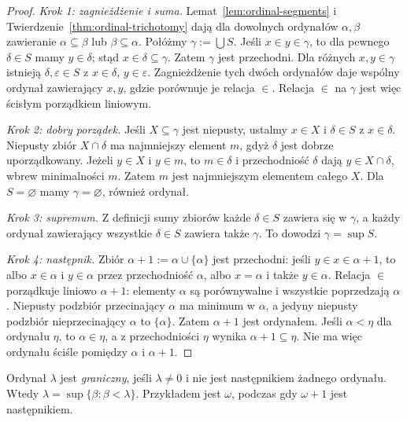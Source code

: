 \begin{proof}
\emph{Krok 1: zagnieżdżenie i suma.}
Lemat~\ref{lem:ordinal-segments}
i Twierdzenie~\ref{thm:ordinal-trichotomy}
dają dla dowolnych ordynałów
$\alpha,\beta$ zawieranie
$\alpha\subseteq\beta$ lub
$\beta\subseteq\alpha$.
Połóżmy $\gamma:=\bigcup S$.
Jeśli $x\in y\in\gamma$, to
dla pewnego $\delta\in S$
mamy $y\in\delta$; stąd
$x\in\delta\subseteq\gamma$.
Zatem $\gamma$ jest przechodni.
Dla różnych $x,y\in\gamma$
istnieją $\delta,\varepsilon\in S$
z $x\in\delta$, $y\in\varepsilon$.
Zagnieżdżenie tych dwóch ordynałów
daje wspólny ordynał zawierający
$x,y$, gdzie porównuje je relacja $\in$.
Relacja $\in$ na $\gamma$
jest więc ścisłym porządkiem liniowym.

\emph{Krok 2: dobry porządek.}
Jeśli $X\subseteq\gamma$ jest niepusty,
ustalmy $x\in X$ i $\delta\in S$
z $x\in\delta$. Niepusty zbiór
$X\cap\delta$ ma najmniejszy
element $m$, gdyż $\delta$ jest
dobrze uporządkowany.
Jeżeli $y\in X$ i $y\in m$,
to $m\in\delta$ i przechodniość
$\delta$ dają $y\in X\cap\delta$,
wbrew minimalności $m$.
Zatem $m$ jest najmniejszym
elementem całego $X$.
Dla $S=\varnothing$ mamy
$\gamma=\varnothing$, również ordynał.

\emph{Krok 3: supremum.}
Z definicji sumy zbiorów
każde $\delta\in S$ zawiera się
w $\gamma$, a każdy ordynał
zawierający wszystkie $\delta\in S$
zawiera także $\gamma$.
To dowodzi $\gamma=\sup S$.

\emph{Krok 4: następnik.}
Zbiór $\alpha+1:=\alpha\cup\{\alpha\}$
jest przechodni: jeśli
$y\in x\in\alpha+1$, to
albo $x\in\alpha$ i $y\in\alpha$
przez przechodniość $\alpha$,
albo $x=\alpha$ i także
$y\in\alpha$.
Relacja $\in$ porządkuje liniowo
$\alpha+1$: elementy $\alpha$
są porównywalne i wszystkie
poprzedzają $\alpha$.
Niepusty podzbiór przecinający
$\alpha$ ma minimum w $\alpha$,
a jedyny niepusty podzbiór
nieprzecinający $\alpha$ to
$\{\alpha\}$.
Zatem $\alpha+1$ jest ordynałem.
Jeśli $\alpha<\eta$ dla ordynału
$\eta$, to $\alpha\in\eta$,
a z przechodniości $\eta$
wynika $\alpha+1\subseteq\eta$.
Nie ma więc ordynału
ściśle pomiędzy $\alpha$ i $\alpha+1$.
\end{proof}
\begin{definicja}\label{def:ordinal-limit}
Ordynał $\lambda$ jest \emph{graniczny}, jeśli $\lambda\ne0$ i nie jest następnikiem żadnego ordynału. Wtedy $\lambda=\sup\{\beta:\beta<\lambda\}$. Przykładem jest $\omega$, podczas gdy $\omega+1$ jest następnikiem.
\end{definicja}


